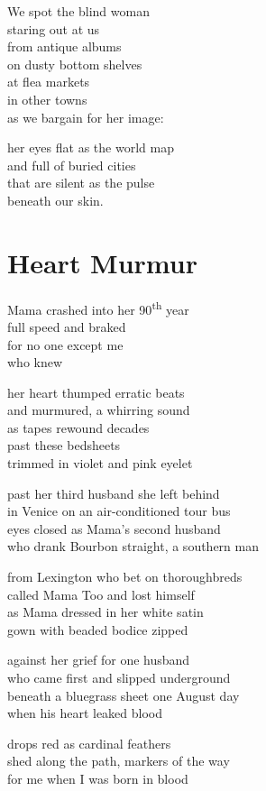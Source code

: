 \documentclass[twoside,10pt]{book}
\begin{document}
We spot the blind woman\\
staring out at us\\
from antique albums\\
on dusty bottom shelves\\
at flea markets\\
in other towns\\
as we bargain for her image:

her eyes flat as the world map\\
and full of buried cities\\
that are silent as the pulse\\
beneath our skin.




\clearpage
\section{Heart Murmur}

Mama crashed into her 90\textsuperscript{th} year\\
full speed and braked\\
for no one except me\\
who knew

her heart thumped erratic beats\\
and murmured, a whirring sound\\
as tapes rewound decades\\
past these bedsheets\\
trimmed in violet and pink eyelet

past her third husband she left behind\\
in Venice on an air-conditioned tour bus\\
eyes closed as Mama's second husband\\
who drank Bourbon straight, a southern man

from Lexington who bet on thoroughbreds\\
called Mama Too and lost himself\\
as Mama dressed in her white satin\\
gown with beaded bodice zipped

against her grief for one husband\\
who came first and slipped underground\\
beneath a bluegrass sheet one August day\\
when his heart leaked blood

drops red as cardinal feathers\\
shed along the path, markers of the way\\
for me when I was born in blood
\end{document}
